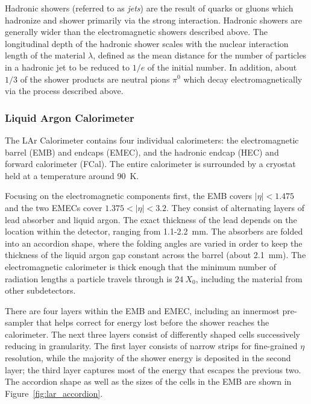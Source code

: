 Hadronic showers (referred to as \emph{jets}) are the result of quarks or gluons which hadronize and shower primarily via the strong interaction.
Hadronic showers are generally wider than the electromagnetic showers described above.
The longitudinal depth of the hadronic shower scales with the nuclear interaction length of the material $\lambda$, defined as the mean distance for the number of particles in a hadronic jet to be reduced to $1/e$ of the initial number.
In addition, about $1/3$ of the shower products are neutral pions $\pi^0$ which decay electromagnetically via the process described above.


\subsubsection{Liquid Argon Calorimeter} \label{sec:lar}
The LAr Calorimeter contains four individual calorimeters: the electromagnetic barrel (EMB) and endcaps (EMEC), and the hadronic endcap (HEC) and forward calorimeter (FCal).
The entire calorimeter is surrounded by a cryostat held at a temperature around 90~K.

Focusing on the electromagnetic components first, the EMB covers $|\eta| < 1.475$ and the two EMECs cover $1.375 < |\eta| < 3.2$.
They consist of alternating layers of lead absorber and liquid argon.
The exact thickness of the lead depends on the location within the detector, ranging from 1.1-2.2~mm.
The absorbers are folded into an accordion shape, where the folding angles are varied in order to keep the thickness of the liquid argon gap constant across the barrel (about 2.1~mm).
The electromagnetic calorimeter is thick enough that the minimum number of radiation lengths a particle travels through is $24~X_0$, including the material from other subdetectors.

There are four layers within the EMB and EMEC, including an innermost pre-sampler that helps correct for energy lost before the shower reaches the calorimeter.
The next three layers consist of differently shaped cells successively reducing in granularity.
The first layer consists of narrow strips for fine-grained $\eta$ resolution, while the majority of the shower energy is deposited in the second layer; the third layer captures most of the energy that escapes the previous two.
The accordion shape as well as the sizes of the cells in the EMB are shown in Figure~\ref{fig:lar_accordion}.

